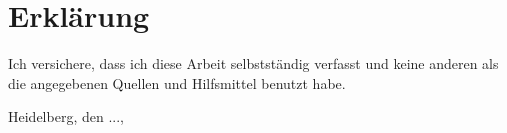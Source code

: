 \chapter*{Erkl\"{a}rung}

Ich versichere, dass ich diese Arbeit selbstst\"{a}ndig verfasst und keine anderen als die angegebenen Quellen und Hilfsmittel benutzt habe.

Heidelberg, den ...,

